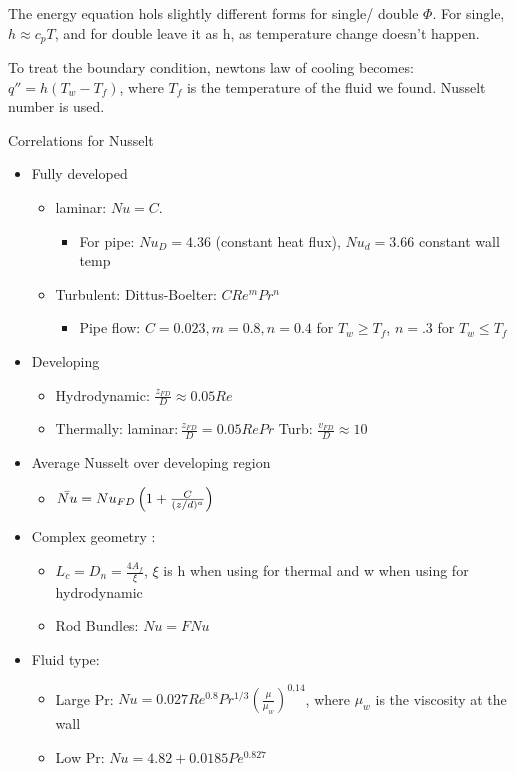 \documentclass{article}
\begin{document}
The energy equation hols slightly different forms for single/ double $\Phi$. For single, $h \approx c_pT$, and for double leave it as h, as temperature change doesn't happen. 

To treat the boundary condition, newtons law of cooling becomes: $q'' = h(T_w - T_f)$, where $T_f$ is the temperature of the fluid we found. Nusselt number is used. 

Correlations for Nusselt

\begin{itemize}
    \item Fully developed
    \begin{itemize}
        \item laminar: $Nu = C$.
        \begin{itemize}
        \item For pipe: $Nu_D = 4.36$ (constant heat flux), $Nu_d = 3.66$ constant wall temp
        \end{itemize}
        \item Turbulent: Dittus-Boelter: $CRe^mPr^n$
        \begin{itemize}
        \item Pipe flow: $C = 0.023, m = 0.8,n =0.4$ for $T_w \geq T_f$, $n = .3$ for $T_w \leq T_f$
        \end{itemize}
    \end{itemize}

    \item Developing
    \begin{itemize}
        \item Hydrodynamic: $\frac{z_{FD}}{D} \approx 0.05 Re$
        \item Thermally: laminar$:\frac{z_{FD}}{D} = 0.05RePr $ Turb: $\frac{v_{FD}}{D} \approx 10$
    \end{itemize}
    \item Average Nusselt over developing region
    \begin{itemize}
        \item $\Bar{Nu} = Nu_{FD}\left( 1 + \frac{C}{(z/d)^a} \right)$
    \end{itemize}
    \item Complex geometry :
    \begin{itemize}
        \item $L_c = D_n = \frac{4A_f}{\xi}$, $\xi$ is h when using for thermal and w when using for hydrodynamic
        \item Rod Bundles: $Nu = FNu$
    \end{itemize}
    \item Fluid type:
    \begin{itemize}
        \item Large Pr: $Nu = 0.027Re^{0.8}Pr^{1/3}(\frac{\mu}{\mu_w})^{0.14}$, where $\mu_w$ is the viscosity at the wall
        \item Low Pr: $Nu = 4.82 + 0.0185Pe^{0.827}$
    \end{itemize}
\end{itemize}
\end{document}
